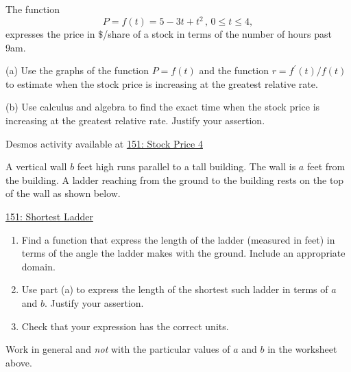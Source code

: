 \documentclass{ximera}
\begin{document}
\begin{question}  \label{Q:dfgtdftrtnhy}
The function 
\[
      P = f(t) = 5 -3t + t^2 \, , \, 0\leq t \leq 4 , 
\]
expresses the price in $\$$/share of a stock in terms of the number of hours past 9am.

(a) Use the graphs of the function $P=f(t)$ and the function $r=f^\prime(t)/f(t)$  to estimate when the stock price is increasing at the greatest relative rate.

(b) Use calculus and algebra to find the exact time when the stock price is increasing at the greatest relative rate. Justify your assertion.



\begin{onlineOnly}
    \begin{center}
\end{center}
\end{onlineOnly}

Desmos activity available at \href{https://www.desmos.com/calculator/y78fnyy7s3}{151: Stock Price 4}

\end{question}






\begin{question}  \label{Q0t0gogppdga}

A vertical wall $b$ feet high runs parallel to a tall building. The wall is $a$ feet from the building. A ladder reaching from the ground to the building rests on the top of the wall as shown below.

\begin{onlineOnly}
   \begin{center}
\end{center}
\end{onlineOnly}

\href{https://www.desmos.com/calculator/4ak46ub8ay}{151: Shortest Ladder}


\begin{enumerate}
\item Find a function that express the length of the ladder (measured in feet) in terms of the angle the ladder makes with the ground. Include an appropriate domain.

\item Use part (a) to express the length of the shortest such ladder in terms of $a$ and $b$. Justify your assertion. 

\item Check that your expression has the correct units.

\end{enumerate}

Work in general and \emph{not} with the particular values of $a$ and $b$ in the worksheet above.

\end{question} 
\end{document}
